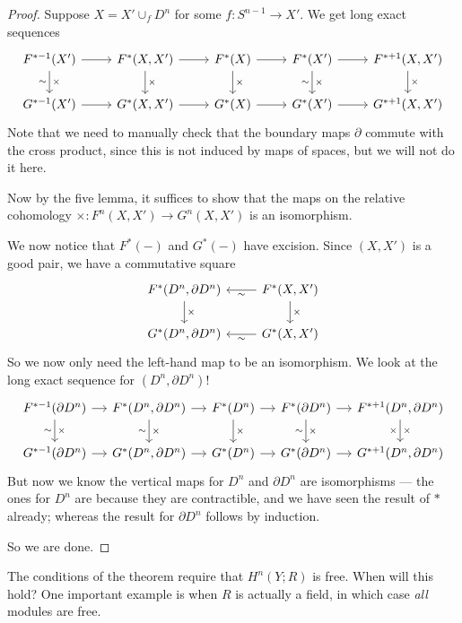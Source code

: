 \documentclass[a4paper]{article}
\theoremstyle{definition}
\begin{document}
\begin{proof}
  Suppose $X = X' \cup_f D^n$ for some $f:S^{n - 1} \to X'$. We get long exact sequences
  \[
    \begin{tikzcd}
      F^{* - 1}(X') \ar[r] \ar[d, "\times", "\sim"'] & F^*(X, X') \ar[r] \ar[d, "\times"] & F^*(X) \ar[r] \ar[d, "\times"] & F^*(X') \ar[r] \ar[d, "\times", "\sim"'] & F^{* + 1}(X, X') \ar[d, "\times"]\\
      G^{* - 1}(X') \ar[r] & G^*(X, X') \ar[r] & G^*(X) \ar[r] & G^*(X') \ar[r] & G^{* + 1}(X, X')
    \end{tikzcd}
  \]
  Note that we need to manually check that the boundary maps $\partial$ commute with the cross product, since this is not induced by maps of spaces, but we will not do it here.

  Now by the five lemma, it suffices to show that the maps on the relative cohomology $\times: F^n(X, X') \to G^n(X, X')$ is an isomorphism.

  We now notice that $F^*(-)$ and $G^*(-)$ have excision. Since $(X, X')$ is a good pair, we have a commutative square
  \[
    \begin{tikzcd}
      F^*(D^n, \partial D^n) \ar[d, "\times"] & F^*(X, X') \ar[l, "\sim"] \ar[d, "\times"] \\
      G^*(D^n, \partial D^n) & G^*(X, X') \ar[l, "\sim"]
    \end{tikzcd}
  \]
  So we now only need the left-hand map to be an isomorphism. We look at the long exact sequence for $(D^n, \partial D^n)$!
  \[
    \begin{tikzcd}[column sep=small]
      F^{* - 1}(\partial D^n) \ar[r] \ar[d, "\times", "\sim"'] & F^*(D^n, \partial D^n) \ar[r] \ar[d, "\times", "\sim"'] & F^*(D^n) \ar[r] \ar[d, "\times"] & F^*(\partial D^n) \ar[r] \ar[d, "\times", "\sim"'] & F^{* + 1}(D^n, \partial D^n) \ar[d, "\times", "\times"']\\
      G^{* - 1}(\partial D^n) \ar[r] & G^*(D^n, \partial D^n) \ar[r] & G^*(D^n) \ar[r] & G^*(\partial D^n) \ar[r] & G^{* + 1}(D^n, \partial D^n)
    \end{tikzcd}
  \]
  But now we know the vertical maps for $D^n$ and $\partial D^n$ are isomorphisms --- the ones for $D^n$ are because they are contractible, and we have seen the result of $*$ already; whereas the result for $\partial D^n$ follows by induction.

  So we are done.
\end{proof}
The conditions of the theorem require that $H^n(Y; R)$ is free. When will this hold? One important example is when $R$ is actually a field, in which case \emph{all} modules are free.
\end{document}
